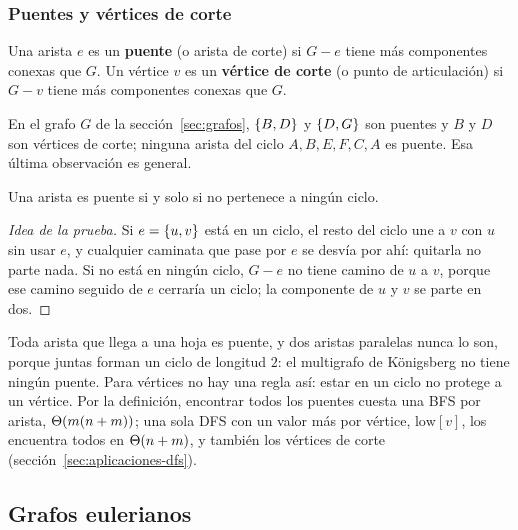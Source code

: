 \documentclass[11pt,letterpaper]{article}
\begin{document}
\subsubsection*{Puentes y vértices de corte}

\begin{definicion}
  \label{def:puente-corte}
  Una arista $e$ es un \textbf{puente} (o arista de corte) si $G - e$
  tiene más componentes conexas que $G$. Un vértice $v$ es un
  \textbf{vértice de corte} (o punto de articulación) si $G - v$ tiene
  más componentes conexas que $G$.
\end{definicion}

En el grafo $G$ de la sección~\ref{sec:grafos}, $\left\{ B, D \right\}$ y
$\left\{ D, G \right\}$ son puentes y $B$ y $D$ son vértices de corte; ninguna
arista del ciclo $A, B, E, F, C, A$ es puente. Esa última observación
es general.

\begin{teorema}
  \label{teo:puente-ciclo}
  Una arista es puente si y solo si no pertenece a ningún ciclo.
\end{teorema}

\begin{proof}[Idea de la prueba]
  Si $e = \left\{ u, v \right\}$ está en un ciclo, el resto del ciclo une a $v$
  con $u$ sin usar $e$, y cualquier caminata que pase por $e$ se desvía
  por ahí: quitarla no parte nada. Si no está en ningún ciclo, $G - e$
  no tiene camino de $u$ a $v$, porque ese camino seguido de $e$
  cerraría un ciclo; la componente de $u$ y $v$ se parte en dos.
\end{proof}

Toda arista que llega a una hoja es puente, y dos aristas paralelas
nunca lo son, porque juntas forman un ciclo de longitud $2$: el
multigrafo de Königsberg no tiene ningún puente. Para vértices no hay
una regla así: estar en un ciclo no protege a un vértice. Por la
definición, encontrar todos los puentes cuesta una BFS por arista,
$\Theta\!\left(m(n + m)\right)$; una sola DFS con un valor más por vértice,
$\text{low}[v]$, los encuentra todos en $\Theta\!\left(n + m\right)$, y también los
vértices de corte (sección~\ref{sec:aplicaciones-dfs}).


\subsection*{Grafos eulerianos}
\end{document}
